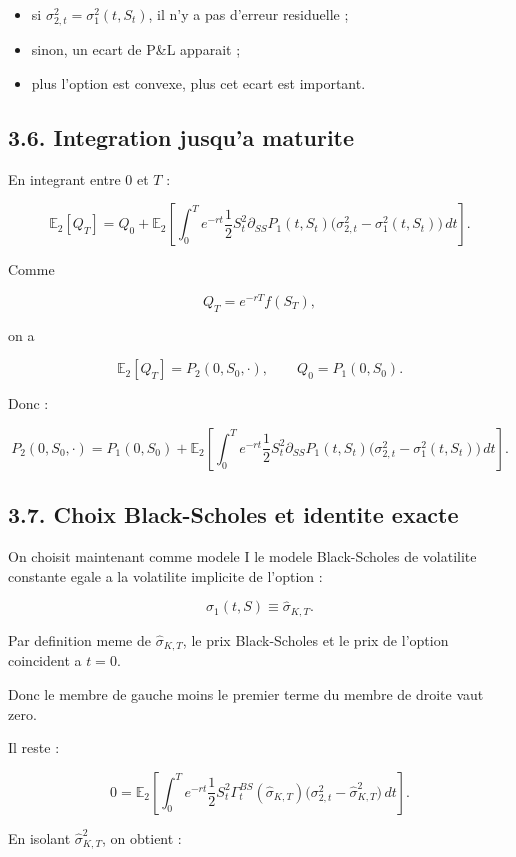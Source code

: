 \documentclass[11pt,a4paper]{article}
\begin{document}
\begin{itemize}
\item si \(\sigma_{2,t}^2=\sigma_1^2(t,S_t)\), il n'y a pas d'erreur residuelle ;
\item sinon, un ecart de P\&L apparait ;
\item plus l'option est convexe, plus cet ecart est important.
\end{itemize}

\subsection{3.6. Integration jusqu'a maturite}

En integrant entre \(0\) et \(T\) :

\[
\mathbb E_2[Q_T]
=
Q_0+
\mathbb E_2\left[
\int_0^T e^{-rt}\frac12 S_t^2\partial_{SS}P_1(t,S_t)\big(\sigma_{2,t}^2-\sigma_1^2(t,S_t)\big)\,dt
\right].
\]

Comme

\[
Q_T=e^{-rT}f(S_T),
\]

on a

\[
\mathbb E_2[Q_T]=P_2(0,S_0,\cdot),
\qquad
Q_0=P_1(0,S_0).
\]

Donc :

\[
\boxed{
P_2(0,S_0,\cdot)
=
P_1(0,S_0)
+
\mathbb E_2\left[
\int_0^T e^{-rt}\frac12 S_t^2\partial_{SS}P_1(t,S_t)\big(\sigma_{2,t}^2-\sigma_1^2(t,S_t)\big)\,dt
\right].
}
\]

\subsection{3.7. Choix Black-Scholes et identite exacte}

On choisit maintenant comme modele I le modele Black-Scholes de volatilite constante egale a la volatilite implicite de l'option :

\[
\sigma_1(t,S)\equiv \widehat{\sigma}_{K,T}.
\]

Par definition meme de \(\widehat{\sigma}_{K,T}\), le prix Black-Scholes et le prix de l'option coincident a \(t=0\).

Donc le membre de gauche moins le premier terme du membre de droite vaut zero.

Il reste :

\[
0=
\mathbb E_2\left[
\int_0^T e^{-rt}\frac12 S_t^2\Gamma_t^{BS}(\widehat{\sigma}_{K,T})\big(\sigma_{2,t}^2-\widehat{\sigma}_{K,T}^2\big)\,dt
\right].
\]

En isolant \(\widehat{\sigma}_{K,T}^2\), on obtient :
\end{document}

